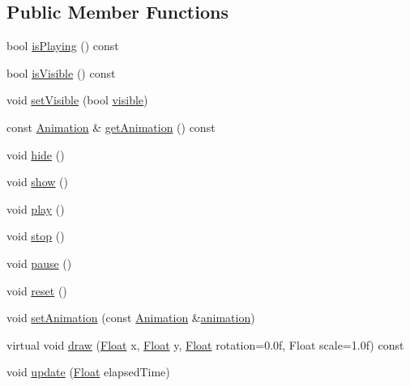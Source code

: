 \subsection*{Public Member Functions}
\begin{DoxyCompactItemize}
\item 
bool \hyperlink{classZeta_1_1AnimationPlayer_a33843a3b32e529d2c49451e8509e49dd}{is\+Playing} () const 
\item 
bool \hyperlink{classZeta_1_1AnimationPlayer_a5cdd2521e62f0a552332227ed255025c}{is\+Visible} () const 
\item 
void \hyperlink{classZeta_1_1AnimationPlayer_a8e9810b807fa865af2f36b486dfe8986}{set\+Visible} (bool \hyperlink{classZeta_1_1AnimationPlayer_a38f2ef2f0e15300c862b860ab3eb8534}{visible})
\item 
const \hyperlink{classZeta_1_1Animation}{Animation} \& \hyperlink{classZeta_1_1AnimationPlayer_a815936f25bc83a7e951c02be2fa2947d}{get\+Animation} () const 
\item 
void \hyperlink{classZeta_1_1AnimationPlayer_a7b5eb7c5d405ad4eeadd1cec7b5b0b31}{hide} ()
\item 
void \hyperlink{classZeta_1_1AnimationPlayer_a73b292e4320d72d6876c83c721c4d3f9}{show} ()
\item 
void \hyperlink{classZeta_1_1AnimationPlayer_af46deb8bcb0d0b7ae3b05143cdd0e723}{play} ()
\item 
void \hyperlink{classZeta_1_1AnimationPlayer_abeb67556245a21b3b4920d2e1ddde5ad}{stop} ()
\item 
void \hyperlink{classZeta_1_1AnimationPlayer_a9ea098f3652d0b2c71a6df288d14f2b7}{pause} ()
\item 
void \hyperlink{classZeta_1_1AnimationPlayer_a3172032334596a83d068be6b8d793b37}{reset} ()
\item 
void \hyperlink{classZeta_1_1AnimationPlayer_ae955334186f203dd9a9bcde92e2d464b}{set\+Animation} (const \hyperlink{classZeta_1_1Animation}{Animation} \&\hyperlink{classZeta_1_1AnimationPlayer_a4b97c373a921a0ea6a67c5371f346ddf}{animation})
\item 
virtual void \hyperlink{classZeta_1_1AnimationPlayer_af1f79cd641cebc5f2a8522c95d5b51a9}{draw} (\hyperlink{namespaceZeta_a1e0a1265f9b3bd3075fb0fabd39088ba}{Float} x, \hyperlink{namespaceZeta_a1e0a1265f9b3bd3075fb0fabd39088ba}{Float} y, \hyperlink{namespaceZeta_a1e0a1265f9b3bd3075fb0fabd39088ba}{Float} rotation=0.\+0f, Float scale=1.\+0f) const 
\item 
void \hyperlink{classZeta_1_1AnimationPlayer_a90616e48740857dbdad920ed871223d3}{update} (\hyperlink{namespaceZeta_a1e0a1265f9b3bd3075fb0fabd39088ba}{Float} elapsed\+Time)

\end{DoxyCompactItemize}
